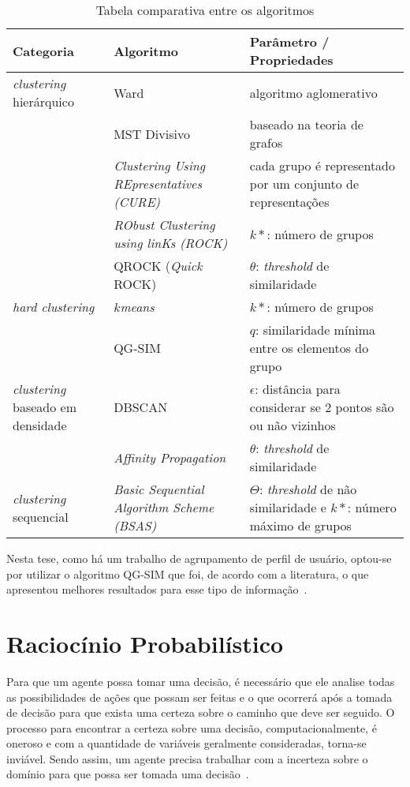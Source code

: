 \begin{table}[h!]
	\caption{Tabela comparativa entre os algoritmos}
	\label{tab:comp_algo_agrupamento}
	\begin{tabular}{ m{2.8cm} | m{5cm} | m{7cm} } \hline
	Categoria & Algoritmo & Parâmetro / Propriedades \\ \hline
	\emph{clustering} hierárquico & Ward & algoritmo aglomerativo \\ \hline
	& MST Divisivo & baseado na teoria de grafos \\ \hline
	& \emph{Clustering Using REpresentatives (CURE)} & cada grupo é representado por um conjunto de representações \\ \hline
	& \emph{RObust Clustering using linKs (ROCK)} & $k*$: número de grupos \\ \hline
	& QROCK (\emph{Quick} ROCK) & $\theta$: \emph{threshold} de similaridade  \\ \hline
	\emph{hard clustering} & $k$\emph{means} & $k*$: número de grupos \\ \hline
    & QG-SIM & $q$: similaridade mínima entre os elementos do grupo \\ \hline
	\emph{clustering} baseado em densidade & DBSCAN & $\epsilon$: distância para considerar se 2 pontos são ou não vizinhos \\ \hline
	& \emph{Affinity Propagation} & $\theta$: \emph{threshold} de similaridade  \\ \hline
	\emph{clustering} sequencial & \emph{Basic Sequential Algorithm Scheme (BSAS)} & $\Theta$: \emph{threshold} de não similaridade e $k*$: número máximo de grupos  \\ \hline
	\end{tabular}
\end{table}

Nesta tese, como há um trabalho de agrupamento de perfil de usuário, optou-se por utilizar o algoritmo QG-SIM que foi, de acordo com a literatura, o que apresentou melhores resultados para esse tipo de informação~\cite{masiero:2013}.

\section{Raciocínio Probabilístico}
\label{sec:raciocinio-probabilistico}
Para que um agente possa tomar uma decisão, é necessário que ele analise todas as possibilidades de ações que possam ser feitas e o que ocorrerá após a tomada de decisão para que exista uma certeza sobre o caminho que deve ser seguido. O processo para encontrar a certeza sobre uma decisão, computacionalmente, é oneroso e com a quantidade de variáveis geralmente consideradas, torna-se inviável. Sendo assim, um agente precisa trabalhar com a incerteza sobre o domínio para que possa ser tomada uma decisão~\cite{russell:2002}.

